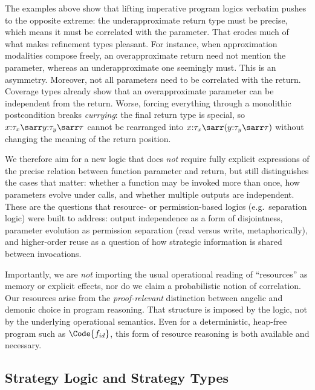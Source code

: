 The examples above show that lifting imperative program logics verbatim pushes to the opposite extreme: the underapproximate return
type must be precise, which means it must be correlated with the parameter.
That erodes much of what makes refinement types pleasant.
For instance, when approximation modalities compose freely, an
overapproximate return need not mention the parameter, whereas an
underapproximate one seemingly must. This is an asymmetry.
Moreover, not all parameters need to be correlated with the return. Coverage types already show that an overapproximate parameter can be independent from the return.
Worse, forcing everything through a monolithic postcondition breaks
\emph{currying}: the final return type is special, so
$x{:}\tau_x \sarr y{:}\tau_y \sarr \tau$ cannot be rearranged into
$x{:}\tau_x \sarr (y{:}\tau_y \sarr \tau)$ without changing the meaning of
the return position.

We therefore aim for a new logic that does \emph{not} require fully
explicit expressions of the precise relation between function parameter and return, but still distinguishes the cases that
matter: whether a function may be invoked more than once, how parameters evolve under calls, and whether multiple outputs are
independent.
These are the questions that resource- or permission-based logics (e.g.\
separation logic) were built to address: output independence as a form of
disjointness, parameter evolution as permission separation (read versus
write, metaphorically), and higher-order reuse as a question of how strategic information is shared between invocations.

Importantly, we are \emph{not} importing the usual operational reading of
``resources'' as memory or explicit effects, nor do we claim a probabilistic
notion of correlation.
Our resources arise from the \emph{proof-relevant} distinction between
angelic and demonic choice in program reasoning. That structure is imposed by the
logic, not by the underlying operational semantics.
Even for a deterministic, heap-free program such as
$\Code{f_{id}}$, this form of resource reasoning is both available
and necessary.

\subsection{Strategy Logic and Strategy Types}

